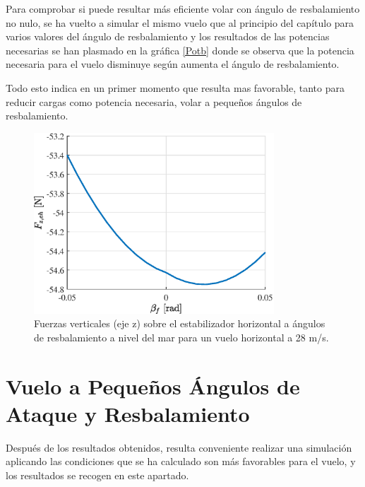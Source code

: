 Para comprobar si puede resultar más eficiente volar con ángulo de resbalamiento no nulo, se ha vuelto a simular el mismo vuelo que al principio del capítulo para varios valores del ángulo de resbalamiento y los resultados de las potencias necesarias se han plasmado en la gráfica \ref{Potb} donde se observa que la potencia necesaria para el vuelo disminuye según aumenta el ángulo de resbalamiento.

Todo esto indica en un primer momento que resulta mas favorable, tanto para reducir cargas como potencia necesaria, volar a pequeños ángulos de resbalamiento.


\begin{figure}
	\centering
	\includegraphics[width=90mm]{graficos/FEHb}
	\caption{Fuerzas verticales (eje z) sobre el estabilizador horizontal a ángulos de resbalamiento a nivel del mar para un vuelo horizontal a 28 m/s.}
	\label{FEHb}
\end{figure}

\section{Vuelo a Pequeños Ángulos de Ataque y Resbalamiento}

Después de los resultados obtenidos, resulta conveniente realizar una simulación aplicando las condiciones que se ha calculado son más favorables para el vuelo, y los resultados se recogen en este apartado.

\singlespacing